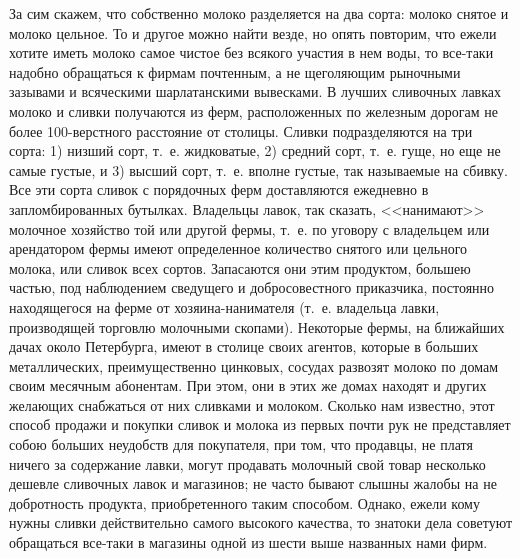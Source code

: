 За сим скажем, что собственно молоко разделяется на два сорта: молоко снятое и молоко цельное. То и другое можно найти везде, но опять повторим, что ежели хотите иметь молоко самое чистое без всякого участия в нем воды, то все-таки надобно обращаться к фирмам почтенным, а не щеголяющим рыночными зазывами и всяческими шарлатанскими вывесками. В лучших сливочных лавках молоко и сливки получаются из ферм, расположенных по железным дорогам не более 100-верстного расстояние от столицы. Сливки подразделяются на три сорта: 1) низший сорт, т.~е. жидковатые, 2) средний сорт, т.~е. гуще, но еще не самые густые, и 3) высший сорт, т.~е. вполне густые, так называемые на сбивку. Все эти сорта сливок с порядочных ферм доставляются ежедневно в запломбированных бутылках. Владельцы лавок, так сказать, <<нанимают>> молочное хозяйство той или другой фермы, т.~е. по уговору с владельцем или арендатором фермы имеют определенное количество снятого или цельного молока, или сливок всех сортов. Запасаются они этим продуктом, большею частью, под наблюдением сведущего и добросовестного приказчика, постоянно находящегося на ферме от хозяина-нанимателя (т.~е. владельца лавки, производящей торговлю молочными скопами). Некоторые фермы, на ближайших дачах около Петербурга, имеют в столице своих агентов, которые в больших металлических, преимущественно цинковых, сосудах развозят молоко по домам своим месячным абонентам. При этом, они в этих же домах находят и других желающих снабжаться от них сливками и молоком. Сколько нам известно, этот способ продажи и покупки сливок и молока из первых почти рук не представляет собою больших неудобств для покупателя, при том, что продавцы, не платя ничего за содержание лавки, могут продавать молочный свой товар несколько дешевле сливочных лавок и магазинов; не часто бывают слышны жалобы на не добротность продукта, приобретенного таким способом. Однако, ежели кому нужны сливки действительно самого высокого качества, то знатоки дела советуют обращаться все-таки в магазины одной из шести выше названных нами фирм.


